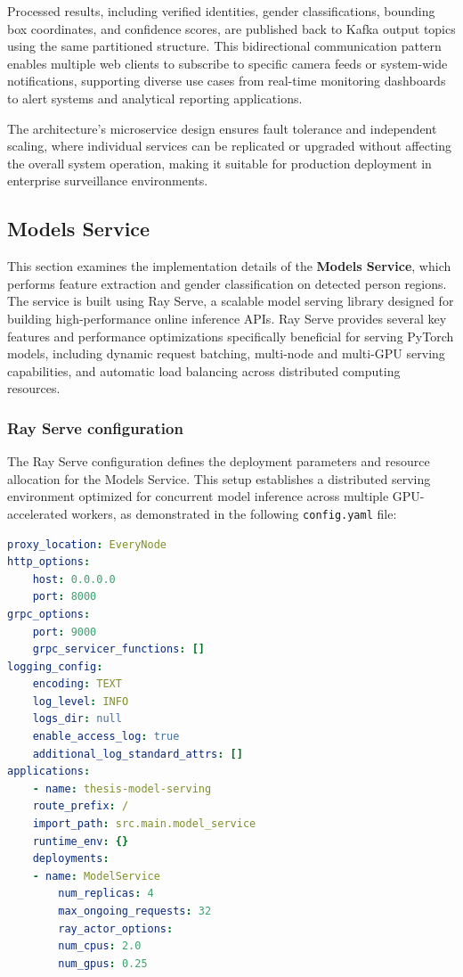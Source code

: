 Processed results, including verified identities, gender classifications, bounding box coordinates, and confidence scores, are published back to Kafka output topics using the same partitioned structure. This bidirectional communication pattern enables multiple web clients to subscribe to specific camera feeds or system-wide notifications, supporting diverse use cases from real-time monitoring dashboards to alert systems and analytical reporting applications.

The architecture's microservice design ensures fault tolerance and independent scaling, where individual services can be replicated or upgraded without affecting the overall system operation, making it suitable for production deployment in enterprise surveillance environments.


\subsection{Models Service}

This section examines the implementation details of the \textbf{Models Service}, which performs feature extraction and gender classification on detected person regions. The service is built using Ray Serve, a scalable model serving library designed for building high-performance online inference APIs. Ray Serve provides several key features and performance optimizations specifically beneficial for serving PyTorch models, including dynamic request batching, multi-node and multi-GPU serving capabilities, and automatic load balancing across distributed computing resources.

\subsubsection{Ray Serve configuration}

The Ray Serve configuration defines the deployment parameters and resource allocation for the Models Service. This setup establishes a distributed serving environment optimized for concurrent model inference across multiple GPU-accelerated workers, as demonstrated in the following \texttt{config.yaml} file:

\begin{lstlisting}[language=yaml, caption=Ray Serve configuration file]
proxy_location: EveryNode
http_options:
    host: 0.0.0.0
    port: 8000
grpc_options:
    port: 9000
    grpc_servicer_functions: []
logging_config:
    encoding: TEXT
    log_level: INFO
    logs_dir: null
    enable_access_log: true
    additional_log_standard_attrs: []
applications:
    - name: thesis-model-serving
    route_prefix: /
    import_path: src.main.model_service
    runtime_env: {}
    deployments:
    - name: ModelService
        num_replicas: 4
        max_ongoing_requests: 32
        ray_actor_options:
        num_cpus: 2.0
        num_gpus: 0.25
\end{lstlisting}



